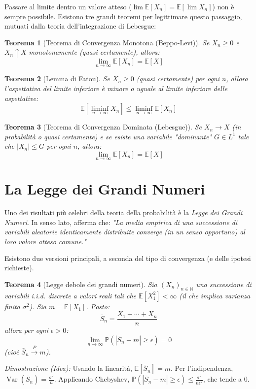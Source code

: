 \documentclass[11pt, a4paper]{report}
\theoremstyle{plain}
\newtheorem{theorem}{Teorema}[chapter]
\theoremstyle{definition}
\theoremstyle{remark}
\newcommand{\PP}{\mathbb{P}}
\newcommand{\E}{\mathbb{E}}
\newcommand{\N}{\mathbb{N}}
\newcommand{\1}{\mathbf{1}}
\begin{document}
Passare al limite dentro un valore atteso ($\lim \E[X_n] = \E[\lim X_n]$) non è sempre possibile. Esistono tre grandi teoremi per legittimare questo passaggio, mutuati dalla teoria dell'integrazione di Lebesgue:

\begin{theorem}[Teorema di Convergenza Monotona (Beppo-Levi)]
Se $X_n \ge 0$ e $X_n \uparrow X$ monotonamente (quasi certamente), allora:
\[ \lim_{n\to\infty} \E[X_n] = \E[X] \]
\end{theorem}

\begin{theorem}[Lemma di Fatou]
Se $X_n \ge 0$ (quasi certamente) per ogni $n$, allora l'aspettativa del limite inferiore è minore o uguale al limite inferiore delle aspettative:
\[ \E\left[\liminf_{n\to\infty} X_n\right] \le \liminf_{n\to\infty} \E[X_n] \]
\end{theorem}

\begin{theorem}[Teorema di Convergenza Dominata (Lebesgue)]
Se $X_n \to X$ (in probabilità o quasi certamente) e se esiste una variabile "dominante" $G \in L^1$ tale che $|X_n| \le G$ per ogni $n$, allora:
\[ \lim_{n\to\infty} \E[X_n] = \E[X] \]
\end{theorem}

\section{La Legge dei Grandi Numeri}

Uno dei risultati più celebri della teoria della probabilità è la \emph{Legge dei Grandi Numeri}. In senso lato, afferma che:
\emph{"La media empirica di una successione di variabili aleatorie identicamente distribuite converge (in un senso opportuno) al loro valore atteso comune."}

Esistono due versioni principali, a seconda del tipo di convergenza (e delle ipotesi richieste).

\begin{theorem}[Legge debole dei grandi numeri]
Sia $(X_n)_{n \in \N}$ una successione di variabili i.i.d. discrete a valori reali tali che $\E[X_1^2] < \infty$ (il che implica varianza finita $\sigma^2$). Sia $m = \E[X_1]$. Posto:
\[ \bar{S}_n = \frac{X_1 + \cdots + X_n}{n} \]
allora per ogni $\epsilon > 0$:
\[ \lim_{n\to\infty} \PP(|\bar{S}_n - m| \ge \epsilon) = 0 \]
(cioè $\bar{S}_n \stackrel{P}{\to} m$).
\end{theorem}
\emph{Dimostrazione (Idea):} Usando la linearità, $\E[\bar{S}_n] = m$. Per l'indipendenza, $\operatorname{Var}(\bar{S}_n) = \frac{\sigma^2}{n}$. Applicando Chebyshev, $\PP(|\bar{S}_n - m| \ge \epsilon) \le \frac{\sigma^2}{n\epsilon^2}$, che tende a 0.
\end{document}
